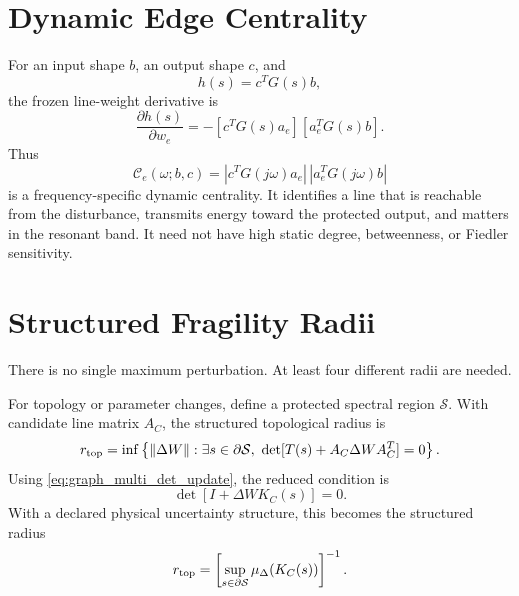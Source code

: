 \section{Dynamic Edge Centrality}

For an input shape \(b\), an output shape \(c\), and
\begin{equation}
  h(s)=c^TG(s)b,
  \label{eq:graph_transfer_scalar}
\end{equation}
the frozen line-weight derivative is
\begin{equation}
  \frac{\partial h(s)}{\partial w_e}
  =
  -
  \left[c^TG(s)a_e\right]
  \left[a_e^TG(s)b\right].
  \label{eq:graph_dynamic_edge_derivative}
\end{equation}
Thus
\begin{equation}
  \mathcal C_e(\omega;b,c)
  =
  |c^TG(j\omega)a_e|\,
  |a_e^TG(j\omega)b|
  \label{eq:graph_dynamic_edge_centrality}
\end{equation}
is a frequency-specific dynamic centrality. It identifies a line that is
reachable from the disturbance, transmits energy toward the protected output,
and matters in the resonant band. It need not have high static degree,
betweenness, or Fiedler sensitivity.

\section{Structured Fragility Radii}

There is no single maximum perturbation. At least four different radii are
needed.

For topology or parameter changes, define a protected spectral region
\(\mathcal S\). With candidate line matrix \(A_C\), the structured topological
radius is
\begin{equation}
  r_{\rm top}
  =
  \inf\left\{
  \norm{\Delta W}:
  \exists s\in\partial\mathcal S,\ 
  \det[T(s)+A_C\Delta W A_C^T]=0
  \right\}.
  \label{eq:graph_topological_radius}
\end{equation}
Using \eqref{eq:graph_multi_det_update}, the reduced condition is
\begin{equation}
  \det[I+\Delta W K_C(s)]=0.
  \label{eq:graph_reduced_fragility_condition}
\end{equation}
With a declared physical uncertainty structure, this becomes the structured
radius
\begin{equation}
  r_{\rm top}
  =
  \left[
  \sup_{s\in\partial\mathcal S}
  \mu_\Delta(K_C(s))
  \right]^{-1}.
  \label{eq:graph_mu_radius}
\end{equation}

